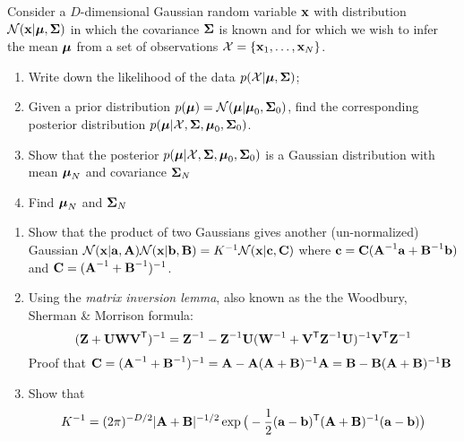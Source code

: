 \documentclass{amsmlaj}
\begin{document}
\begin{problem}
Consider a $D$-dimensional Gaussian random variable $\bm{\mathbf{x}}$ with
distribution $\mathcal{N}(\bm{\mathbf{x}}|\bm{\mathbf{\mu}},\bm{\mathbf{\Sigma}})$ in which the
covariance $\bm{\mathbf{\Sigma}}$ is known and for which we wish to infer the
mean $\bm{\mathbf{\mu}}$ from a set of observations
$\mathcal{X}=\{\bm{\mathbf{x}}_1,\dotsc,\bm{\mathbf{x}}_N\}$. 
\begin{enumerate}
\item Write down the likelihood of the data
				$p(\mathcal{X}|\bm{\mathbf{\mu}},\bm{\mathbf{\Sigma}})$;
\item Given a prior distribution
				$p(\bm{\mathbf{\mu}})=\mathcal{N}(\bm{\mathbf{\mu}}|\bm{\mathbf{\mu}}_0,\bm{\mathbf{\Sigma}}_0)$,
				find the corresponding posterior distribution
				$p(\bm{\mathbf{\mu}}|\mathcal{X},\bm{\mathbf{\Sigma}},\bm{\mathbf{\mu}}_0,\bm{\mathbf{\Sigma}}_0)$.
\item Show that the posterior
				$p(\bm{\mathbf{\mu}}|\mathcal{X},\bm{\mathbf{\Sigma}},\bm{\mathbf{\mu}}_0,\bm{\mathbf{\Sigma}}_0)$
				is a Gaussian distribution with mean $\bm{\mathbf{\mu}}_N$ and
				covariance $\bm{\mathbf{\Sigma}}_N$
\item Find $\bm{\mathbf{\mu}}_N$ and $\bm{\mathbf{\Sigma}}_N$
\end{enumerate}
\end{problem}
\begin{problem}

\begin{enumerate}
\item Show that the product of two Gaussians gives another
				(un-normalized) Gaussian
				$
				\mathcal{N}(\bm{\mathbf{x}}|\bm{\mathbf{a}},\bm{\mathbf{A}})\mathcal{N}(\bm{\mathbf{x}}|\bm{\mathbf{b}},\bm{\mathbf{B}})
				= K^{-1}\mathcal{N}(\bm{\mathbf{x}}|\bm{\mathbf{c}},\bm{\mathbf{C}})
				$
				where $\bm{\mathbf{c}}=\bm{\mathbf{C}}(\bm{\mathbf{A}}^{-1}\bm{\mathbf{a}} +
				\bm{\mathbf{B}}^{-1}\bm{\mathbf{b}})$ and
				$\bm{\mathbf{C}}=(\bm{\mathbf{A}}^{-1}+\bm{\mathbf{B}}^{-1})^{-1}$.
\item Using the \emph{matrix inversion lemma}, also known as the
				the Woodbury, Sherman \& Morrison formula: 
				\begin{equation}
								(\bm{\mathbf{Z}}+\bm{\mathbf{U}}\bm{\mathbf{W}}\bm{\mathbf{V}}^{\mathsf{T}})^{-1} =
								\bm{\mathbf{Z}}^{-1} -
								\bm{\mathbf{Z}}^{-1}\bm{\mathbf{U}}(\bm{\mathbf{W}}^{-1}+\bm{\mathbf{V}}^{\mathsf{T}}
								\bm{\mathbf{Z}}^{-1}\bm{\mathbf{U}})^{-1}\bm{\mathbf{V}}^{\mathsf{T}} \bm{\mathbf{Z}}^{-1}
				\end{equation}
				Proof that $\bm{\mathbf{C}} =
				(\bm{\mathbf{A}}^{-1}+\bm{\mathbf{B}}^{-1})^{-1}=\bm{\mathbf{A}} -
				\bm{\mathbf{A}}(\bm{\mathbf{A}}+\bm{\mathbf{B}})^{-1}\bm{\mathbf{A}} = \bm{\mathbf{B}} -
				\bm{\mathbf{B}}(\bm{\mathbf{A}}+\bm{\mathbf{B}})^{-1}\bm{\mathbf{B}}$
				
\item Show that
				\begin{equation}
								K^{-1} = (2\pi)^{-D/2}|\bm{\mathbf{A}}+\bm{\mathbf{B}}|^{-1/2}
								\exp\big( -\frac{1}{2}(\bm{\mathbf{a}}-\bm{\mathbf{b}})^{\mathsf{T}}
								(\bm{\mathbf{A}}+\bm{\mathbf{B}})^{-1} (\bm{\mathbf{a}}-\bm{\mathbf{b}})\big)
				\end{equation}
\end{enumerate}
\end{problem}
\end{document}
